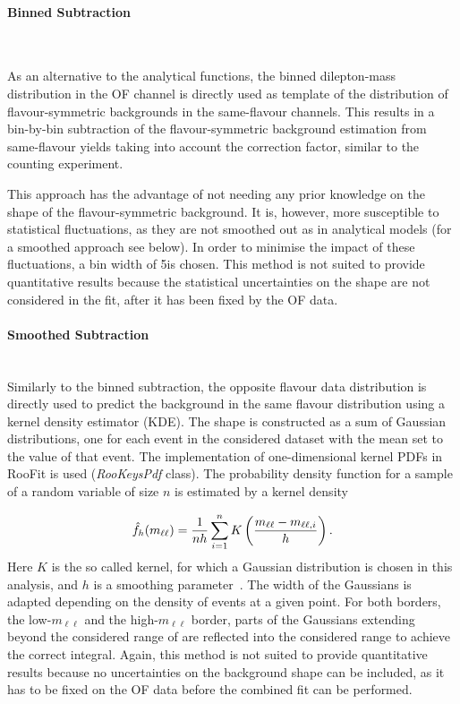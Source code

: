 \paragraph{Binned Subtraction}\mbox{} \\


\label{shapesubtraction:binnedsubtraction}

As an alternative to the analytical functions, the binned dilepton-mass distribution in the OF channel is directly used as  template of the distribution of flavour-symmetric backgrounds in the same-flavour channels. This results in a bin-by-bin subtraction of the flavour-symmetric background estimation from same-flavour yields taking into account the \Rsfof correction factor, similar to the counting experiment.

This approach has the advantage of not needing any prior knowledge on the shape of the flavour-symmetric background. It is, however, more susceptible to statistical fluctuations, as they are not smoothed out as in analytical models (for a smoothed approach see below). In order to minimise the impact of these fluctuations, a bin width of 5\GeV is chosen. This method is not suited to provide quantitative results because the statistical uncertainties on the shape are not considered in the fit, after it has been fixed by the OF data.

\paragraph{Smoothed Subtraction}\mbox{} \\
Similarly to the binned subtraction, the opposite flavour data distribution is directly used to predict the background in the same flavour distribution using a kernel density estimator (KDE). The shape is constructed as a sum of Gaussian distributions, one for each event in the considered dataset with the mean set to the \mll value of that event. The implementation of one-dimensional kernel PDFs in RooFit is used (\emph{RooKeysPdf} class). The probability density function for a sample of a random variable of size $n$ is estimated by a kernel density

\begin{equation*}
\hat{f}_h(m_{\ell\ell}) = \frac{1}{nh}\sum\limits_{i=1}^n K\left(\frac{m_{\ell\ell}-m_{\ell\ell,i}}{h}\right).
\end{equation*}
Here $K$ is the so called kernel, for which a Gaussian distribution is chosen in this analysis, and $h$ is a smoothing parameter~\cite{kernelDensity}. The width of the Gaussians is adapted depending on the density of events at a given point. For both borders, the low-$m_{\ell\ell}$ and the high-$m_{\ell\ell}$ border, parts of the Gaussians extending beyond the considered range of \mll are reflected into the considered range to achieve the correct integral. Again, this method is not suited to provide quantitative results because no uncertainties on the background shape can be included, as it has to be fixed on the OF data before the combined fit can be performed.



